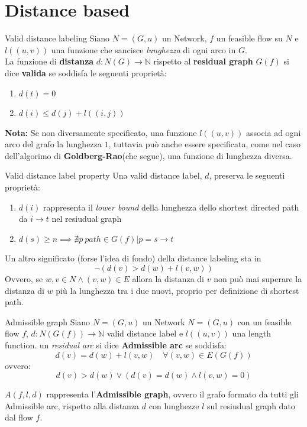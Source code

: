 \documentclass[a4paper, 11pt]{report}
\begin{document}
\section{Distance based}
\begin{definition}[label = VDL]{Valid distance labeling}{}
    Siano $N = (G,u)$ un Network, $f$ un feasible flow su $N$ e $l((u,v))$ una funzione che sancisce \textit{lunghezza} di ogni arco in $G$.\\
    La funzione di \textbf{distanza} $d: N(G) \rightarrow \mathbb{N}$ rispetto al \textbf{residual graph}
    $G(f)$  si dice \textbf{valida} se soddisfa le seguenti proprietà:
    \begin{enumerate}
        \item $d(t) = 0$
        \item $d(i) \le d(j) + l((i,j))$
    \end{enumerate}
\end{definition}
\textbf{Nota:} Se non diversamente specificato, una funzione $l((u,v))$ associa ad ogni arco del grafo la lunghezza $1$,
 tuttavia può anche essere specificata, come nel caso dell'algorimo di \textbf{Goldberg-Rao}(che segue),
una funzione di lunghezza diversa. 
\begin{obs}{Valid distance label property}{}
    Una valid distance label, $d$, preserva le seguenti proprietà:
    \begin{enumerate}
        \item $d(i)$ rappresenta il \textit{lower bound} della lunghezza dello shortest directed path da $i \rightarrow t$
        nel resiudual graph
        \item $d(s) \ge n \implies \nexists p\ path \in G(f) | p = s \rightarrow t $ %
    \end{enumerate}
    
\end{obs}
Un altro significato (forse l'idea di fondo) della distance labeling sta in \[\neg (d(v) > d(w) + l(v,w))\]
Ovvero, se $w,v \in N \land (v,w) \in E$ allora la distanza di $v$ non può mai superare la distanza di $w$ più la lunghezza tra i due nuovi, 
proprio per definizione di shortest path.

\begin{definition}[label = AdmissibleGraph]{Admissible graph}{}
    Siano $N = (G,u)$ un Network $N = (G,u)$ con un feasible flow $f$, $d: N(G(f)) \rightarrow \mathbb{N}$ valid distance label 
    e $l((u,v))$ una length function.
    un \textit{residual arc} si dice \textbf{Admissible arc} se soddisfa:
    \[d(v) = d(w) + l(v,w) \quad \forall (v,w) \in E(G(f))\]
    ovvero:
    \[d(v) > d(w) \lor (d(v) = d(w) \land l(v,w) = 0)\]
    
    $A(f,l,d)$ rappresenta l'\textbf{Admissible graph}, ovvero il grafo formato da tutti gli Admissible arc, rispetto alla distanza $d$ con lunghezze $l$ 
    sul resiudual graph dato dal flow $f$.
\end{definition}
\end{document}
